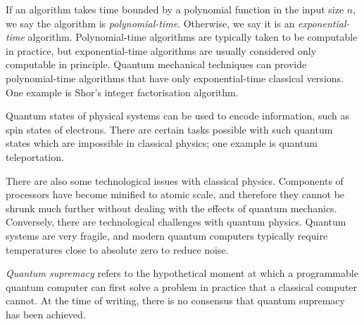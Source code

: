 If an algorithm takes time bounded by a polynomial function in the input size \( n \), we say the algorithm is \emph{polynomial-time}.
Otherwise, we say it is an \emph{exponential-time} algorithm.
Polynomial-time algorithms are typically taken to be computable in practice, but exponential-time algorithms are usually considered only computable in principle.
Quantum mechanical techniques can provide polynomial-time algorithms that have only exponential-time classical versions.
One example is Shor's integer factorisation algorithm.

Quantum states of physical systems can be used to encode information, such as spin states of electrons.
There are certain tasks possible with such quantum states which are impossible in classical physics; one example is quantum teleportation.

There are also some technological issues with classical physics.
Components of processors have become minified to atomic scale, and therefore they cannot be shrunk much further without dealing with the effects of quantum mechanics.
Conversely, there are technological challenges with quantum physics.
Quantum systems are very fragile, and modern quantum computers typically require temperatures close to absolute zero to reduce noise.

\emph{Quantum supremacy} refers to the hypothetical moment at which a programmable quantum computer can first solve a problem in practice that a classical computer cannot.
At the time of writing, there is no consensus that quantum supremacy has been achieved.

